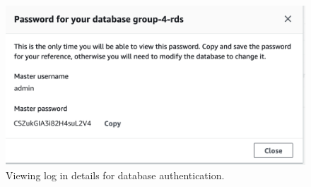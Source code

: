 \begin{figure}[!htbp]
    \centering
    \includegraphics[width=\textwidth]{resources/RDS_password}
    \caption{Viewing log in details for database authentication.}
    \label{fig:view-rds-auth}
\end{figure}

%
%
%
%
%
%
